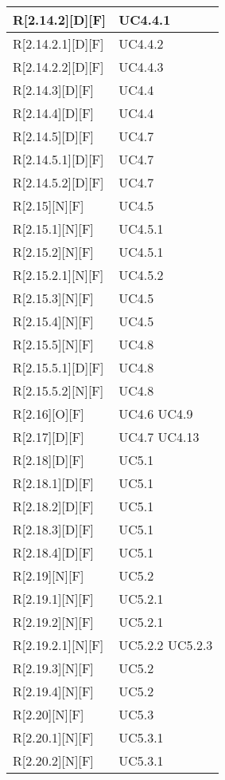 \begin{longtable}{X | X}
\hline
R[2.14.2][D][F] & UC4.4.1 \\
\hline
R[2.14.2.1][D][F] & UC4.4.2 \\
\hline
R[2.14.2.2][D][F] & UC4.4.3 \\
\hline
R[2.14.3][D][F] & UC4.4 \\
\hline
R[2.14.4][D][F] & UC4.4 \\
\hline
R[2.14.5][D][F] & UC4.7 \\
\hline
R[2.14.5.1][D][F] & UC4.7 \\
\hline
R[2.14.5.2][D][F] & UC4.7 \\
\hline
R[2.15][N][F] & UC4.5 \\
\hline
R[2.15.1][N][F] & UC4.5.1 \\
\hline
R[2.15.2][N][F] & UC4.5.1 \\
\hline
R[2.15.2.1][N][F] & UC4.5.2 \\
\hline
R[2.15.3][N][F] & UC4.5 \\
\hline
R[2.15.4][N][F] & UC4.5 \\
\hline
R[2.15.5][N][F] & UC4.8 \\
\hline
R[2.15.5.1][D][F] & UC4.8 \\
\hline
R[2.15.5.2][N][F] & UC4.8 \\
\hline
R[2.16][O][F] & UC4.6 \newline UC4.9 \\
\hline
R[2.17][D][F] & UC4.7 \newline UC4.13 \\
\hline
R[2.18][D][F] & UC5.1 \\
\hline
R[2.18.1][D][F] & UC5.1 \\
\hline
R[2.18.2][D][F] & UC5.1 \\
\hline
R[2.18.3][D][F] & UC5.1 \\
\hline
R[2.18.4][D][F] & UC5.1 \\
\hline
R[2.19][N][F] & UC5.2 \\
\hline
R[2.19.1][N][F] & UC5.2.1 \\
\hline
R[2.19.2][N][F] & UC5.2.1 \\
\hline
R[2.19.2.1][N][F] & UC5.2.2 \newline UC5.2.3 \\
\hline
R[2.19.3][N][F] & UC5.2 \\
\hline
R[2.19.4][N][F] & UC5.2 \\
\hline
R[2.20][N][F] & UC5.3 \\
\hline
R[2.20.1][N][F] & UC5.3.1 \\
\hline
R[2.20.2][N][F] & UC5.3.1 \\

\end{longtable}
